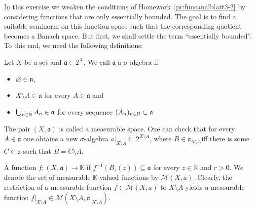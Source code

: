 \begin{Problem}
	In this exercise we weaken the conditions of Homework~\ref{pr:funcanalblatt3-2} by considering functions that are only essentially bounded. The goal is to find a suitable seminorm on this function space such that the corresponding quotient becomes a Banach space. But first, we shall settle the term ``essentially bounded''. To this end, we need the following definitions:

	Let $X$ be a set and $\mathfrak{a}\in 2^X$. We call $\mathfrak{a}$ a $\sigma$-algebra if
	\begin{itemize}
		\item $\varnothing\in\mathfrak{n}$,
		\item $X \setminus A\in \mathfrak{a}$ for every $A\in \mathfrak{a}$ and
		\item $\bigcup_{n\in \mathbb{N}} A_n\in \mathfrak{a}$ for every sequence $(A_n)_{n\in \mathbb{N}}\subset \mathfrak{a}$
	\end{itemize}
	The pair $(X, \mathfrak{a})$ is called a measurable space. One can check that for every $A\in \mathfrak{a}$ one obtains a new $\sigma$-algebra $a|_{X\setminus A}\subseteq 2^{X \setminus A}$, where $B\in \mathfrak{a}_{X \setminus A}$iff there is some $C\in \mathfrak{a}$ such that $B=C \setminus A$.

	A function $f: (X, \mathfrak{a})\to \mathbb{K}$ if $f^{-1}(B_r(z))\subseteq \mathfrak{a}$ for every $z\in \mathbb{K}$ and $r>0$. We denote the set of measurable $\mathbb{K}$-valued functions by $\mathcal{M}(X, a)$. Clearly, the restriction of a measurable function $f\in \mathcal{M}(X, a)$ to $X \setminus A$ yields a measurable function $f|_{X \setminus A}\in \mathcal{M}(X \setminus A, \mathfrak{a}|_{X \setminus A})$.


\end{Problem}
